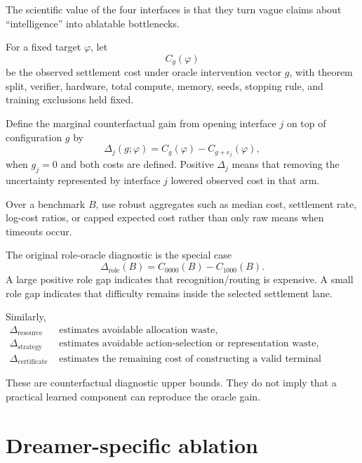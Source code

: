 \documentclass[11pt]{article}
\begin{document}
The scientific value of the four interfaces is that they turn vague claims about ``intelligence'' into ablatable bottlenecks.

For a fixed target $\varphi$, let
\begin{equation}
C_g(\varphi)
\end{equation}
be the observed settlement cost under oracle intervention vector $g$, with theorem split, verifier, hardware, total compute, memory, seeds, stopping rule, and training exclusions held fixed.

Define the marginal counterfactual gain from opening interface $j$ on top of configuration $g$ by
\begin{equation}
\Delta_j(g;\varphi)
=
C_g(\varphi)-C_{g+e_j}(\varphi),
\end{equation}
when $g_j=0$ and both costs are defined. Positive $\Delta_j$ means that removing the uncertainty represented by interface $j$ lowered observed cost in that arm.

Over a benchmark $B$, use robust aggregates such as median cost, settlement rate, log-cost ratios, or capped expected cost rather than only raw means when timeouts occur.

The original role-oracle diagnostic is the special case
\begin{equation}
\Delta_{\mathrm{role}}(B)
=
C_{0000}(B)-C_{1000}(B).
\end{equation}
A large positive role gap indicates that recognition/routing is expensive. A small role gap indicates that difficulty remains inside the selected settlement lane.

Similarly,
\begin{align}
\Delta_{\mathrm{resource}} &\text{ estimates avoidable allocation waste},\\
\Delta_{\mathrm{strategy}} &\text{ estimates avoidable action-selection or representation waste},\\
\Delta_{\mathrm{certificate}} &\text{ estimates the remaining cost of constructing a valid terminal certificate.}
\end{align}

These are counterfactual diagnostic upper bounds. They do not imply that a practical learned component can reproduce the oracle gain.

\section{Dreamer-specific ablation}
\end{document}
